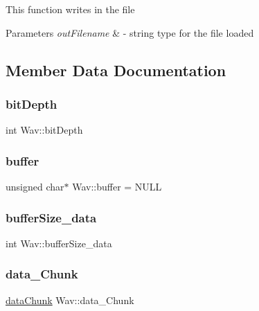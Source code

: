 This function writes in the file 
\begin{DoxyParams}{Parameters}
{\em out\+Filename} & -\/ string type for the file loaded \\
\hline
\end{DoxyParams}


\subsection{Member Data Documentation}
\mbox{\label{classWav_aaf92f0800a562d0f80783026607c8097}} 
\subsubsection{\texorpdfstring{bit\+Depth}{bitDepth}}
{\footnotesize\ttfamily int Wav\+::bit\+Depth\hspace{0.3cm}{\ttfamily [protected]}}

\mbox{\label{classWav_ae1ba9e10151e9d104c150f6cc5512199}} 
\subsubsection{\texorpdfstring{buffer}{buffer}}
{\footnotesize\ttfamily unsigned char$\ast$ Wav\+::buffer = N\+U\+LL\hspace{0.3cm}{\ttfamily [protected]}}

\mbox{\label{classWav_aaa1fc130f301f39cc74091dfb9750d13}} 
\subsubsection{\texorpdfstring{buffer\+Size\+\_\+data}{bufferSize\_data}}
{\footnotesize\ttfamily int Wav\+::buffer\+Size\+\_\+data\hspace{0.3cm}{\ttfamily [protected]}}

\mbox{\label{classWav_ad56011c7baf92b85b81483d7ef8b58ef}} 
\subsubsection{\texorpdfstring{data\+\_\+\+Chunk}{data\_Chunk}}
{\footnotesize\ttfamily \hyperlink{structdataChunk}{data\+Chunk} Wav\+::data\+\_\+\+Chunk\hspace{0.3cm}{\ttfamily [protected]}}

